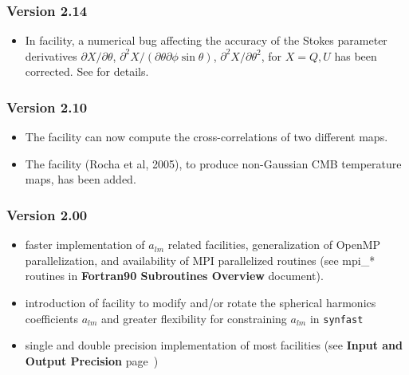 \documentclass[12pt,twoside]{article}
\renewcommand{\ell}{l}
\newcommand{\compresslist}{%
\setlength{\itemsep}{0ex}}{}
\begin{document}
{\subsubsection{Version 2.14}
\begin{itemize}\compresslist
\item In  facility, a numerical bug affecting the accuracy of the Stokes parameter derivatives 
$\partial X/\partial\theta$, 
$\partial^2 X/(\partial\theta\partial\phi\sin\theta)$, 
$\partial^2 X/\partial \theta^2$, 
for $X=Q,U$ has been corrected. See  for details.
\end{itemize}

\subsubsection{Version 2.10}
\begin{itemize}\compresslist
\item The  facility can now compute the cross-correlations of two different
maps. 
\item The  facility (Rocha et al, 2005), to produce non-Gaussian CMB temperature maps,
has been added.
\end{itemize}

\subsubsection{Version 2.00}
\begin{itemize}\compresslist
\item faster implementation of $a_{\ell m}$ related facilities, generalization of
  OpenMP parallelization, and availability of MPI parallelized routines (see
  mpi\_* routines in {\bf Fortran90 Subroutines Overview} document).
\item introduction of  facility to modify and/or rotate the spherical
  harmonics coefficients $a_{\ell m}$ and greater flexibility for constraining
  $a_{\ell m}$ in {\tt synfast}
\item single and double precision implementation of most facilities (see {\bf {Input and Output Precision}}
  page~\pageref{page:ioprec})
\end{itemize}
}%
\end{document}
